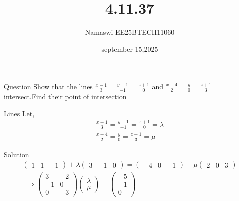 \documentclass{beamer}
\begin{document}
\title 
{4.11.37}
\date{september 15,2025}


\author 
{Namaswi-EE25BTECH11060}
\frame{\titlepage}
\begin{frame}{Question}
Show that the lines $\frac{x-1}{3}=\frac{y-1}{-1}=\frac{z+1}{0}$  and $\frac{x+4}{2}=\frac{y}{0}=\frac{z+1}{3}$ intersect.Find their point of intersection
\end{frame}
\begin{frame}{Lines}
  Let,
\begin{align}
\frac{x-1}{3}=\frac{y-1}{-1}=\frac{z+1}{0}=\lambda\\
\frac{x+4}{2}=\frac{y}{0}=\frac{z+1}{3}=\mu
\end{align}  
\end{frame}
\begin{frame}{Solution}
    \begin{align}
     \begin{pmatrix}
         1 & 1 & -1 
     \end{pmatrix}+\lambda \begin{pmatrix}
         3 & -1 & 0
     \end{pmatrix}=\begin{pmatrix}
         -4 & 0 & -1 
     \end{pmatrix}+ \mu \begin{pmatrix}
         2 & 0 & 3
     \end{pmatrix}\\
     \implies \begin{pmatrix}
         3 & -2 \\ -1 & 0 \\ 0 & -3 
     \end{pmatrix}\begin{pmatrix}
         \lambda \\ \mu
     \end{pmatrix}=\begin{pmatrix}
         -5 \\ -1 \\ 0
     \end{pmatrix}\\
 \end{align}
\end{frame}
\end{document}
